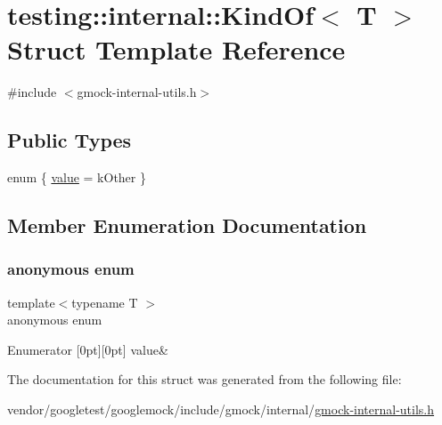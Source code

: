 \hypertarget{structtesting_1_1internal_1_1_kind_of}{}\section{testing\+:\+:internal\+:\+:Kind\+Of$<$ T $>$ Struct Template Reference}
\label{structtesting_1_1internal_1_1_kind_of}


{\ttfamily \#include $<$gmock-\/internal-\/utils.\+h$>$}

\subsection*{Public Types}
\begin{DoxyCompactItemize}
\item 
enum \{ \hyperlink{structtesting_1_1internal_1_1_kind_of_a4866389a4bc8d5522b5f8ae61a42f520a30d28b30579739dfb2d410825ac3aaa8}{value} = k\+Other
 \}
\end{DoxyCompactItemize}


\subsection{Member Enumeration Documentation}
\mbox{\label{structtesting_1_1internal_1_1_kind_of_a4866389a4bc8d5522b5f8ae61a42f520}} 
\subsubsection{\texorpdfstring{anonymous enum}{anonymous enum}}
{\footnotesize\ttfamily template$<$typename T $>$ \\
anonymous enum}

\begin{DoxyEnumFields}{Enumerator}
[0pt][0pt]{}\mbox{\label{structtesting_1_1internal_1_1_kind_of_a4866389a4bc8d5522b5f8ae61a42f520a30d28b30579739dfb2d410825ac3aaa8}} 
value&\\
\hline

\end{DoxyEnumFields}


The documentation for this struct was generated from the following file\+:\begin{DoxyCompactItemize}
\item 
vendor/googletest/googlemock/include/gmock/internal/\hyperlink{gmock-internal-utils_8h}{gmock-\/internal-\/utils.\+h}\end{DoxyCompactItemize}

